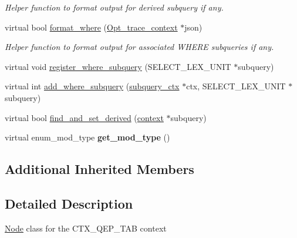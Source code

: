 \begin{DoxyCompactItemize}
\begin{DoxyCompactList}\small\item\em Helper function to format output for derived subquery if any. \end{DoxyCompactList}\item 
\mbox{\label{classopt__explain__json__namespace_1_1join__tab__ctx_abeadc80c4b02bc40709baa7a0281bb53}} 
virtual bool \mbox{\hyperlink{classopt__explain__json__namespace_1_1join__tab__ctx_abeadc80c4b02bc40709baa7a0281bb53}{format\+\_\+where}} (\mbox{\hyperlink{classOpt__trace__context}{Opt\+\_\+trace\+\_\+context}} $\ast$json)
\begin{DoxyCompactList}\small\item\em Helper function to format output for associated W\+H\+E\+RE subqueries if any. \end{DoxyCompactList}\item 
virtual void \mbox{\hyperlink{classopt__explain__json__namespace_1_1join__tab__ctx_acac0818845848eba4191f94df3281973}{register\+\_\+where\+\_\+subquery}} (S\+E\+L\+E\+C\+T\+\_\+\+L\+E\+X\+\_\+\+U\+N\+IT $\ast$subquery)
\item 
virtual int \mbox{\hyperlink{classopt__explain__json__namespace_1_1join__tab__ctx_a6884d85a538e28bfac75c41159438d01}{add\+\_\+where\+\_\+subquery}} (\mbox{\hyperlink{classopt__explain__json__namespace_1_1subquery__ctx}{subquery\+\_\+ctx}} $\ast$ctx, S\+E\+L\+E\+C\+T\+\_\+\+L\+E\+X\+\_\+\+U\+N\+IT $\ast$subquery)
\item 
virtual bool \mbox{\hyperlink{classopt__explain__json__namespace_1_1join__tab__ctx_afc798daee06122e7680cd80245fdf54d}{find\+\_\+and\+\_\+set\+\_\+derived}} (\mbox{\hyperlink{classopt__explain__json__namespace_1_1context}{context}} $\ast$subquery)
\item 
\mbox{\label{classopt__explain__json__namespace_1_1join__tab__ctx_aa6f6e28acaa43bf7eb32b1d70da15e96}} 
virtual enum\+\_\+mod\+\_\+type {\bfseries get\+\_\+mod\+\_\+type} ()
\end{DoxyCompactItemize}
\subsection*{Additional Inherited Members}


\subsection{Detailed Description}
\mbox{\hyperlink{classNode}{Node}} class for the C\+T\+X\+\_\+\+Q\+E\+P\+\_\+\+T\+AB context 

